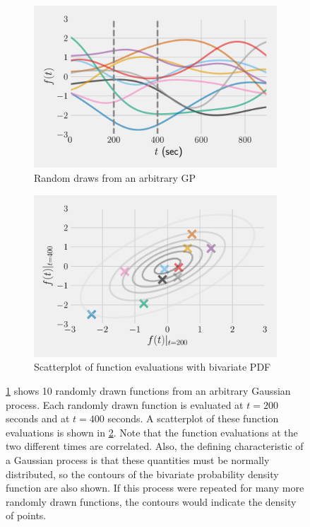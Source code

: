 \documentclass{article}
\begin{document}
\begin{figure}[htbp]
  \centering
  \begin{subfigure}[t]{.45\textwidth}
      \centering
      \includegraphics[width=\textwidth,keepaspectratio]{figures/gp_draws.pdf}
      \caption{Random draws from an arbitrary GP}
      \label{fig:gp_draws}
  \end{subfigure}
  \begin{subfigure}[t]{.45\textwidth}
      \centering
      \includegraphics[width=\textwidth ,keepaspectratio]{figures/gp_scatter.pdf}
      \caption{Scatterplot of function evaluations with bivariate PDF}
      \label{fig:gp_scatter}
  \end{subfigure}
  \caption{\protect\ref{fig:gp_draws} shows 10 randomly drawn functions from an arbitrary Gaussian process. Each randomly drawn function is evaluated at $t=200$ seconds and at $t=400$ seconds. A scatterplot of these function evaluations is shown in \protect\ref{fig:gp_scatter}. Note that the function evaluations at the two different times are correlated. Also, the defining characteristic of a Gaussian process is that these quantities must be normally distributed, so the contours of the bivariate probability density function are also shown. If this process were repeated for many more randomly drawn functions, the contours would indicate the density of points.}
  \label{fig:gp_illustration}
\end{figure}
\end{document}
